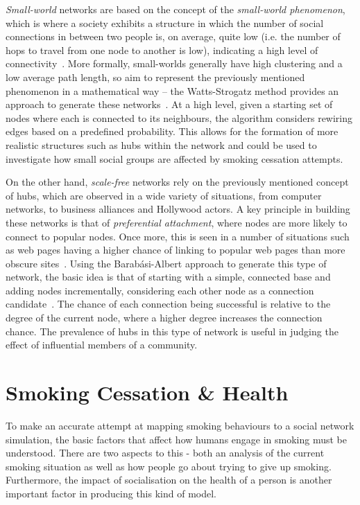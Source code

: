 \documentclass[]{report}
\begin{document}
\emph{Small-world} networks are based on the concept of the \emph{small-world phenomenon}, which is where a society exhibits a structure in which the number of social connections in between two people is, on average, quite low (i.e. the number of hops to travel from one node to another is low), indicating a high level of connectivity~\cite{milgram}. More formally, small-worlds generally have high clustering and a low average path length, so aim to represent the previously mentioned phenomenon in a mathematical way – the Watts-Strogatz method provides an approach to generate these networks~\cite{small-world}. At a high level, given a starting set of nodes where each is connected to its neighbours, the algorithm considers rewiring edges based on a predefined probability. This allows for the formation of more realistic structures such as hubs within the network and could be used to investigate how small social groups are affected by smoking cessation attempts.

On the other hand, \emph{scale-free} networks rely on the previously mentioned concept of hubs, which are observed in a wide variety of situations, from computer networks, to business alliances and Hollywood actors. A key principle in building these networks is that of \emph{preferential attachment}, where nodes are more likely to connect to popular nodes. Once more, this is seen in a number of situations such as web pages having a higher chance of linking to popular web pages than more obscure sites~\cite{BA-SciAm}. Using the Barab\'{a}si-Albert approach to generate this type of network, the basic idea is that of starting with a simple, connected base and adding nodes incrementally, considering each other node as a connection candidate~\cite{BAStat}. The chance of each connection being successful is relative to the degree of the current node, where a higher degree increases the connection chance. The prevalence of hubs in this type of network is useful in judging the effect of influential members of a community.


\section{Smoking Cessation \& Health}

To make an accurate attempt at mapping smoking behaviours to a social network simulation, the basic factors that affect how humans engage in smoking must be understood. There are two aspects to this - both an analysis of the current smoking situation as well as how people go about trying to give up smoking. Furthermore, the impact of socialisation on the health of a person is another important factor in producing this kind of model.
\end{document}
